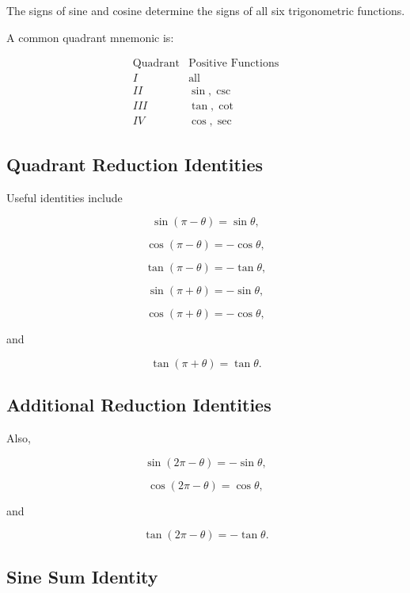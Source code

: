 The signs of sine and cosine determine the signs of all six trigonometric
functions.

A common quadrant mnemonic is:

\[
\boxed{
\begin{array}{c|c}
\text{Quadrant} & \text{Positive Functions} \\ \hline
I & \text{all} \\
II & \sin,\csc \\
III & \tan,\cot \\
IV & \cos,\sec
\end{array}
}
\]

\subsection{Quadrant Reduction Identities}
\label{subsec:quadrant-reduction-identities}

Useful identities include

\[
\boxed{
\sin(\pi-\theta)
=
\sin\theta,
}
\]

\[
\boxed{
\cos(\pi-\theta)
=
-\cos\theta,
}
\]

\[
\boxed{
\tan(\pi-\theta)
=
-\tan\theta,
}
\]

\[
\boxed{
\sin(\pi+\theta)
=
-\sin\theta,
}
\]

\[
\boxed{
\cos(\pi+\theta)
=
-\cos\theta,
}
\]

and

\[
\boxed{
\tan(\pi+\theta)
=
\tan\theta.
}
\]

\subsection{Additional Reduction Identities}
\label{subsec:additional-reduction-identities}

Also,

\[
\boxed{
\sin(2\pi-\theta)
=
-\sin\theta,
}
\]

\[
\boxed{
\cos(2\pi-\theta)
=
\cos\theta,
}
\]

and

\[
\boxed{
\tan(2\pi-\theta)
=
-\tan\theta.
}
\]

\subsection{Sine Sum Identity}
\label{subsec:sine-sum-identity}

